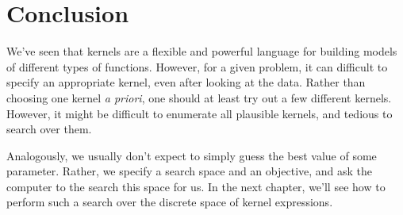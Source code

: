 

\section{Conclusion}

We've seen that kernels are a flexible and powerful language for building models of different types of functions.
However, for a given problem, it can difficult to specify an appropriate kernel, even after looking at the data.
Rather than choosing one kernel \emph{a priori}, one should at least try out a few different kernels.
However, it might be difficult to enumerate all plausible kernels, and tedious to search over them.

Analogously, we usually don't expect to simply guess the best value of some parameter.
Rather, we specify a search space and an objective, and ask the computer to the search this space for us. 
In the next chapter, we'll see how to perform such a search over the discrete space of kernel expressions.


\outbpdocument{


}


